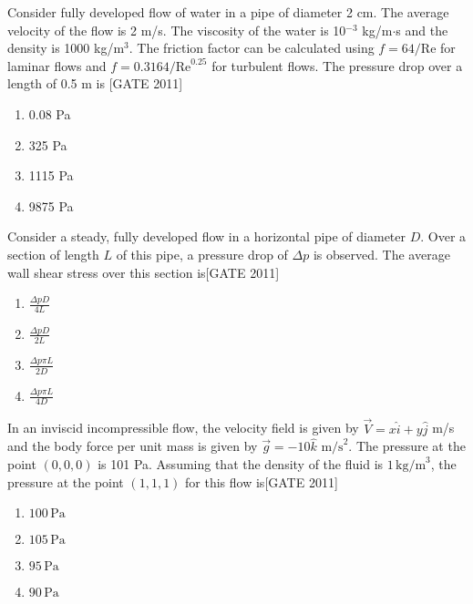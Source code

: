 \item Consider fully developed flow of water in a pipe of diameter 2 cm. The average velocity of the flow is 2 m/s. The viscosity of the water is 10$^{-3}$ kg/m$\cdot$s and the density is 1000 kg/m$^3$. The friction factor can be calculated using $f = 64 / \text{Re}$ for laminar flows and $f = 0.3164 / \text{Re}^{0.25}$ for turbulent flows. The pressure drop over a length of 0.5 m is
\hfill{[GATE 2011]}
\begin{multicols}{4}
\begin{enumerate}
    \item 0.08 Pa
    \item 325 Pa
    \item 1115 Pa
    \item 9875 Pa
\end{enumerate}
\end{multicols}
\item Consider a steady, fully developed flow in a horizontal pipe of diameter $D$. Over a section of length $L$ of this pipe, a pressure drop of $\Delta p$ is observed. The average wall shear stress over this section is\hfill{[GATE 2011]}
    \begin{multicols}{4}
        \begin{enumerate}
            \item $\frac{\Delta p D}{4L}$
            \item $\frac{\Delta p D}{2L}$
            \item $\frac{\Delta p \pi L}{2D}$
            \item $\frac{\Delta p \pi L}{4D}$
        \end{enumerate}
    \end{multicols}
    
\item In an inviscid incompressible flow, the velocity field is given by $\vec{V} = x\hat{i} + y\hat{j}$ m/s and the body force per unit mass is given by $\vec{g} = -10\hat{k}  \text{ m/s}^2$. The pressure at the point $(0, 0, 0)$ is 101 Pa. Assuming that the density of the fluid is $1 \, \text{kg/m}^3$, the pressure at the point $(1, 1, 1)$ for this flow is\hfill{[GATE 2011]}
    \begin{multicols}{4}
        \begin{enumerate}
            \item $100 \, \text{Pa}$
            \item $105 \, \text{Pa}$
            \item $95 \, \text{Pa}$
            \item $90 \, \text{Pa}$
        \end{enumerate}
    \end{multicols}
    


